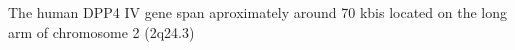The human DPP4 IV gene span aproximately around 70 kbis located on the long arm of chromosome 2 (2q24.3)